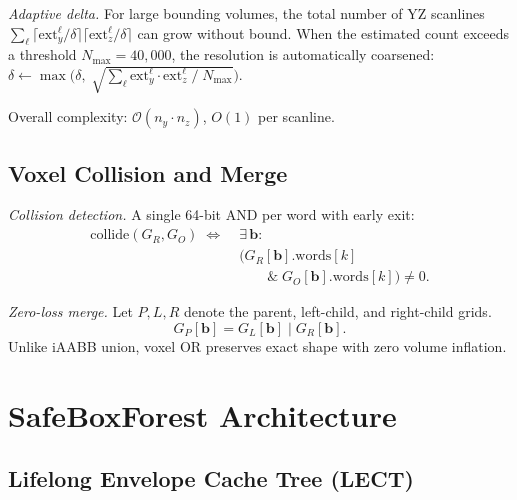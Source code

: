 \documentclass[journal]{IEEEtran}
\newcommand{\calO}{\mathcal{O}}
\begin{document}
\emph{Adaptive delta.}
For large bounding volumes, the total number of YZ scanlines
$\sum_\ell \lceil \mathrm{ext}_y^\ell / \delta \rceil
         \lceil \mathrm{ext}_z^\ell / \delta \rceil$
can grow without bound.
When the estimated count exceeds a threshold $N_{\max}{=}40{,}000$,
the resolution is automatically coarsened:
$\delta \leftarrow \max\!\bigl(\delta,\;
\sqrt{\textstyle\sum_\ell \mathrm{ext}_y^\ell \cdot
\mathrm{ext}_z^\ell \;/\; N_{\max}}\bigr)$.

Overall complexity: $\calO(n_y \cdot n_z)$, $O(1)$ per scanline.

\subsection{Voxel Collision and Merge}\label{sec:voxel_ops}

\emph{Collision detection.}
A single 64-bit AND per word with early exit:
\begin{equation}
  \begin{aligned}
    \text{collide}(G_R, G_O) \;\Leftrightarrow\;&\exists\, \bm{b}: \\
    &\bigl(G_R[\bm{b}].\mathrm{words}[k]\\
    &\qquad\mathbin{\&}\; G_O[\bm{b}].\mathrm{words}[k]\bigr) \ne 0.
  \end{aligned}
\end{equation}

\emph{Zero-loss merge.}
Let $P,L,R$ denote the parent, left-child, and right-child grids.
\begin{equation}
  G_P[\bm{b}] = G_L[\bm{b}] \mathbin{|} G_R[\bm{b}].
\end{equation}
Unlike iAABB union, voxel OR preserves exact shape with zero volume
inflation.

\section{SafeBoxForest Architecture}\label{sec:sbf}


\subsection{Lifelong Envelope Cache Tree (LECT)}\label{sec:lect}
\end{document}

